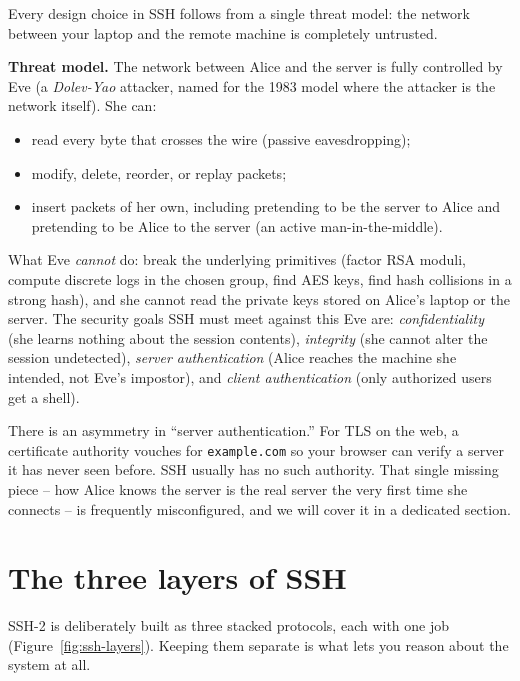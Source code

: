 Every design choice in SSH follows from a single threat model: the network between your laptop and the remote machine is completely untrusted.

\begin{focusbox}
\textbf{Threat model.} The network between Alice and the server is fully controlled by Eve (a \emph{Dolev-Yao} attacker, named for the 1983 model where the attacker is the network itself). She can:
\begin{itemize}
  \item read every byte that crosses the wire (passive eavesdropping);
  \item modify, delete, reorder, or replay packets;
  \item insert packets of her own, including pretending to be the server to Alice and pretending to be Alice to the server (an active man-in-the-middle).
\end{itemize}
What Eve \emph{cannot} do: break the underlying primitives (factor RSA moduli, compute discrete logs in the chosen group, find AES keys, find hash collisions in a strong hash), and she cannot read the private keys stored on Alice's laptop or the server. The security goals SSH must meet against this Eve are: \emph{confidentiality} (she learns nothing about the session contents), \emph{integrity} (she cannot alter the session undetected), \emph{server authentication} (Alice reaches the machine she intended, not Eve's impostor), and \emph{client authentication} (only authorized users get a shell).
\end{focusbox}

There is an asymmetry in ``server authentication.'' For TLS on the web, a certificate authority vouches for \texttt{example.com} so your browser can verify a server it has never seen before. SSH usually has no such authority. That single missing piece -- how Alice knows the server is the real server the very first time she connects -- is frequently misconfigured, and we will cover it in a dedicated section.

\section{The three layers of SSH}

SSH-2 is deliberately built as three stacked protocols, each with one job (Figure~\ref{fig:ssh-layers}). Keeping them separate is what lets you reason about the system at all.

